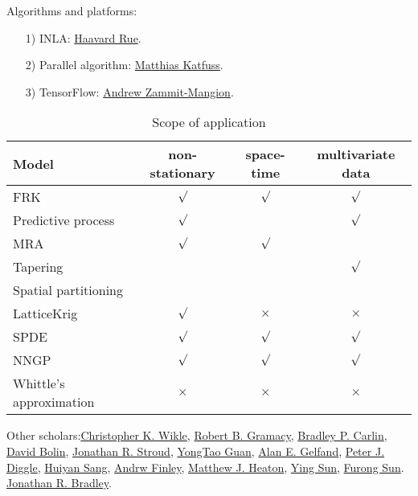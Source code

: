 \documentclass[
12pt, %
a4paper, %
oneside, %
headinclude,footinclude, %
BCOR5mm, %
]{scrartcl}
\begin{document}
Algorithms and platforms:
\begin{itemize}
  \item [1)] INLA: \href{https://cemse.kaust.edu.sa/bayescomp}{Haavard Rue}.
  \item [2)] Parallel algorithm: \href{https://sites.google.com/view/katzfuss/}{Matthias Katfuss}.
  \item [3)] TensorFlow: \href{https://niasra.uow.edu.au/cei/people/UOW202823.html}{Andrew Zammit-Mangion}.
\end{itemize}
\begin{table}[H]
	\caption{Scope of application}
\begin{tabular}{|l|c|c|c|}
\hline
{\bf Model} & {\bf non-stationary} & {\bf space-time} & {\bf multivariate data} \\
\hline
       FRK &  $\surd$    &   $\surd$         &     $\surd$       \\
\hline
Predictive process &   $\surd$     &            &  $\surd$          \\
\hline
       MRA &  $\surd$     &    $\surd$    &            \\
\hline
  Tapering &      &            &    $\surd$    \\
\hline
Spatial partitioning &            &            &            \\
\hline
LatticeKrig &   $\surd$     &   $\times$    &   $\times$    \\
\hline
      SPDE &   $\surd$    &    $\surd$   &    $\surd$  \\
\hline
      NNGP &   $\surd$    &    $\surd$    &   $\surd$         \\
\hline
Whittle’s approximation &   $\times$      &   $\times$    &    $\times$   \\
\hline
\end{tabular}  
  \label{table:Scope}
\end{table}

Other scholars:\href{https://www.stat.missouri.edu/people/wikle}{Christopher K. Wikle},
\href{https://bobby.gramacy.com/research/}{Robert B. Gramacy},
\href{https://www.counterpointstat.com/bradleycarlin.html}{Bradley P. Carlin},
\href{https://cemse.kaust.edu.sa/stochproc}{David Bolin},
\href{https://gufaculty360.georgetown.edu/s/contact/00336000014SrlEAAS/jonathan-stroud}{Jonathan R. Stroud},
\href{https://www.bus.miami.edu/thought-leadership/faculty/management-science/guan.html}{YongTao Guan},
\href{http://www2.stat.duke.edu/~alan/}{Alan E. Gelfand},
\href{https://www.lancaster.ac.uk/staff/diggle/}{Peter J. Diggle},
\href{https://www.stat.tamu.edu/~huiyan/}{Huiyan  Sang},
\href{https://www.canr.msu.edu/people/andrew_o_finley}{Andrw Finley},
\href{https://mheaton.byu.edu/docs/research.html}{Matthew J. Heaton},
\href{https://www.kaust.edu.sa/en/study/faculty/ying-sun}{Ying Sun},
\href{https://scholar.google.com/citations?user=dbFZvbwAAAAJ&hl=en}{Furong Sun}.
\href{https://sites.google.com/site/jonathanbradley28/}{Jonathan R. Bradley}.
\end{document}
